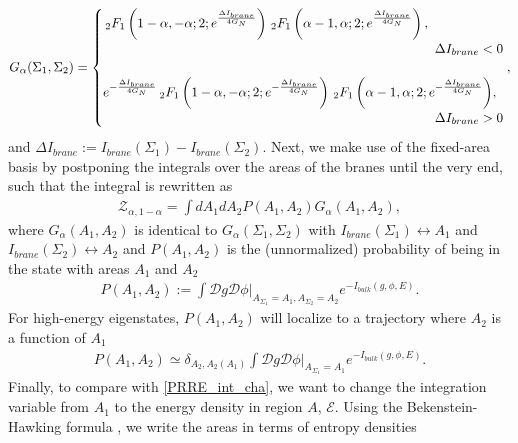\documentclass[a4paper,11pt]{article}
\newcommand*{\JKF}[1]{\textcolor{blue}{[JKF: #1]}}
\newcommand*{\SR}[1]{\textcolor{magenta}{[SR: \textsf{#1}]}}
\begin{document}
\begin{align}
    G_{\alpha}(\Sigma_1,\Sigma_2) = \begin{cases}\, _2F_1\left(1-{\alpha},-{\alpha};2;e^{\frac{\Delta I_{brane}}{4G_N}}\right)
    \,
   _2F_1\left({\alpha}-1,{\alpha};2;e^{\frac{\Delta I_{brane}}{4G_N}}\right), 
       \\
       &\hspace{-2cm}\Delta I_{brane} < 0
   \\
   \\
   e^{-\frac{\Delta I_{brane}}{4G_N}}{ \, _2F_1\left(1-{\alpha},-{\alpha};2;e^{-\frac{\Delta I_{brane}}{4G_N}}\right)
     \,
   _2F_1\left({\alpha}-1,{\alpha};2;e^{-\frac{\Delta I_{brane}}{4G_N}}\right)} , 
     \\
       &\hspace{-2cm}  \Delta I_{brane} > 0
   \end{cases},
\end{align}
and $\Delta I_{brane}:=I_{brane}(\Sigma_1)-I_{brane}(\Sigma_2) $. Next, we make use of the fixed-area basis by postponing the integrals over the areas of the branes until the very end, such that the integral is rewritten as 
\begin{align}
    \mathcal{Z}_{\alpha, 1-\alpha} =\int dA_1dA_2 P(A_1, A_2) G_{\alpha}(A_1,A_2),
\end{align}
where $G_{\alpha}(A_1,A_2)$ is identical to $G_{\alpha}(\Sigma_1,\Sigma_2)$ with $I_{brane}(\Sigma_1)\leftrightarrow A_1$ and $I_{brane}(\Sigma_2)\leftrightarrow A_2$ and $ P(A_1, A_2)$ is the (unnormalized) probability of being in the state with areas $A_1$ and $A_2$
\begin{align}
    P(A_1, A_2) := \int \mathcal{D}g\mathcal{D}\phi\Big|_{A_{\Sigma_1} = A_1,A_{\Sigma_2} = A_2}e^{-I_{bulk}(g,\phi, E) }.
\end{align}
For high-energy eigenstates, $P(A_1,A_2)$ will localize to a trajectory where $A_2$ is a function of $A_1$ \cite{2020JHEP...11..007D}
\begin{align}
    P(A_1, A_2) \simeq \delta_{A_2, A_2(A_1)} \int \mathcal{D}g\mathcal{D}\phi\Big|_{A_{\Sigma_1} = A_1}e^{-I_{bulk}(g,\phi, E) }.
\end{align}
Finally, to compare with \eqref{PRRE_int_cha}, we want to change the integration variable from $A_1$ to the energy density in region $A$, $\mathcal{E}$. Using the Bekenstein-Hawking formula \cite{cmp/1103899181}, we write the areas in terms of entropy densities
\end{document}
